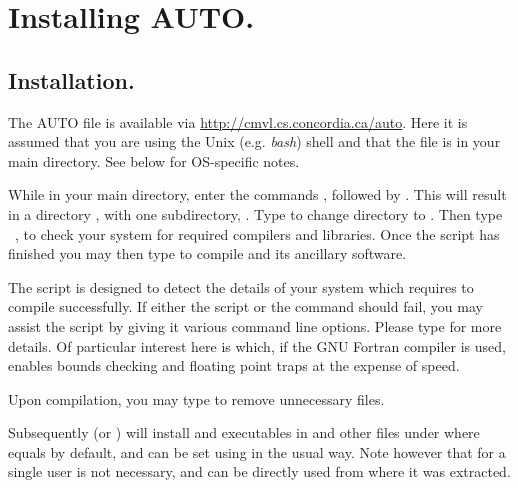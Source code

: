 \documentclass[12pt]{report}
\begin{document}
\chapter{Installing {\cal AUTO}.} \label{ch:Installing_AUTO}
\section{ Installation.} \label{sec:Installation}
The {\cal AUTO} file  is
available via \url{http://cmvl.cs.concordia.ca/auto}.
Here it is assumed that you are using the Unix (e.g. \emph{bash}) shell 
and that the file  is in your main
directory. See below for OS-specific notes.

While in your main directory, enter the commands
,
followed by .
This will result in a directory , 
with one subdirectory, . 
Type 
to change directory to .
Then type
~,
to check your system for required compilers and libraries.
Once the  script has finished you 
may then type  to compile \AUTO
and its ancillary software.

The  script is designed to detect the details
of your system which \AUTO requires to compile successfully.
If either the  script or the  command
should fail, you may assist the  script by giving
it various command line options.  Please type 
for more details. Of particular interest here is
 which, if the GNU Fortran
compiler is used, enables bounds checking and floating point traps at
the expense of speed.

Upon compilation, you may type 
to remove unnecessary files.

Subsequently  (or )
will install  and
 executables in  and other files under
 where  equals
 by default, and can be set using
 in the usual way.
Note however that for a single user
 is not necessary, and \AUTO can be directly
used from where it was extracted.
\end{document}
